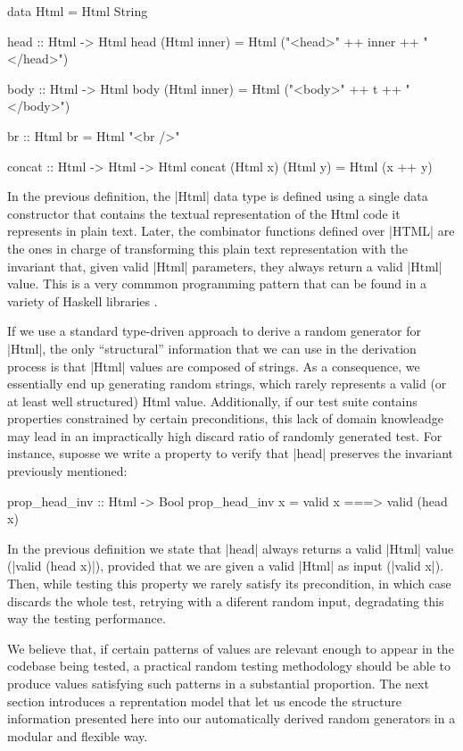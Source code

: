 \begin{code}
data Html = Html String

head :: Html -> Html
head (Html inner)
  = Html ("<head>" ++ inner ++ "</head>")

body :: Html -> Html
body (Html inner)
  = Html ("<body>" ++ t ++ "</body>")

br :: Html
br = Html "<br />"

concat :: Html -> Html -> Html
concat (Html x) (Html y) = Html (x ++ y)
\end{code}

In the previous definition, the |Html| data type is defined using a single data
constructor that contains the textual representation of the Html code it
represents in plain text.
%
Later, the combinator functions defined over |HTML| are the ones in charge of
transforming this plain text representation with the invariant that, given valid
|Html| parameters, they always return a valid |Html| value.
%
This is a very commmon programming pattern that can be found in a variety of
Haskell libraries \tocite{}.


If we use a standard type-driven approach to derive a random generator for
|Html|, the only ``structural'' information that we can use in the derivation
process is that |Html| values are composed of strings.
%
As a consequence, we essentially end up generating random strings, which rarely
represents a valid (or at least well structured) Html value.
%
Additionally, if our test suite contains properties constrained by certain
preconditions, this lack of domain knowleadge may lead in an impractically high
discard ratio of randomly generated test.
%
For instance, suposse we write a property to verify that |head| preserves the
invariant previously mentioned:

\begin{code}
prop_head_inv :: Html -> Bool
prop_head_inv x = valid x ===> valid (head x)
\end{code}

In the previous definition we state that |head| always returns a valid |Html|
value (|valid (head x)|), provided that we are given a valid |Html| as input
(|valid x|).
%
Then, while testing this property we rarely satisfy its precondition, in which
case \quickcheck discards the whole test, retrying with a diferent random input,
degradating this way the testing performance.


We believe that, if certain patterns of values are relevant enough to appear in
the codebase being tested, a practical random testing methodology should be able
to produce values satisfying such patterns in a substantial proportion.
%
The next section introduces a reprentation model that let us encode the
structure information presented here into our automatically derived random
generators in a modular and flexible way.






